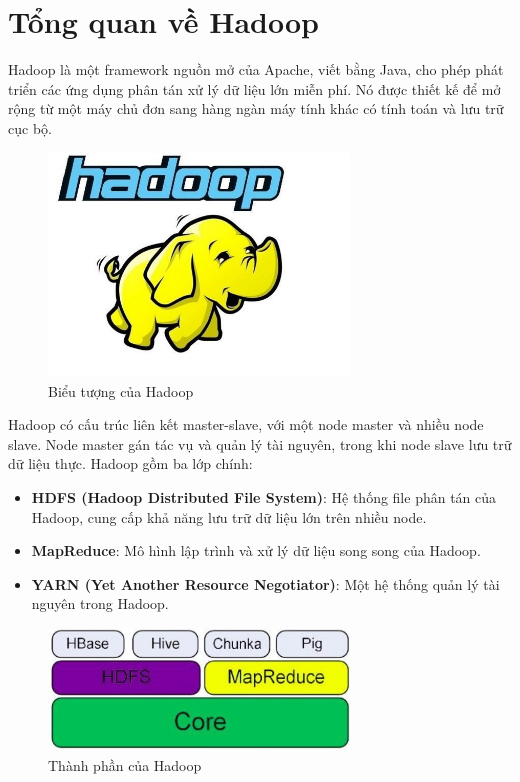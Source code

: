 \documentclass{report}
\begin{document}
\section{Tổng quan về Hadoop}
Hadoop là một framework nguồn mở của Apache, viết bằng Java, cho phép
phát triển các ứng dụng phân tán xử lý dữ liệu lớn miễn phí. Nó được
thiết kế để mở rộng từ một máy chủ đơn sang hàng ngàn máy tính khác có
tính toán và lưu trữ cục bộ.
\begin{figure}[h]
    \centering
    \includegraphics[width=8cm]{images/Hadoop1.jpg}
    \caption{Biểu tượng của Hadoop}
\end{figure}
\newline
Hadoop có cấu trúc liên kết master-slave, với một node master và nhiều
node slave. Node master gán tác vụ và quản lý tài nguyên, trong khi node slave
lưu trữ dữ liệu thực. Hadoop gồm ba lớp chính:
\begin{itemize}
    \item \textbf{HDFS (Hadoop Distributed File System)}: Hệ thống file phân tán
          của Hadoop, cung cấp khả năng lưu trữ dữ liệu lớn trên nhiều node.
    \item \textbf{MapReduce}: Mô hình lập trình và xử lý dữ liệu song song
          của Hadoop.
    \item \textbf{YARN (Yet Another Resource Negotiator)}: Một hệ thống quản lý
          tài nguyên trong Hadoop.
\end{itemize}
\begin{figure}[h]
    \centering
    \includegraphics[width=8cm]{images/Hadoop2.jpg}
    \caption{Thành phần của Hadoop}
\end{figure}
\end{document}
